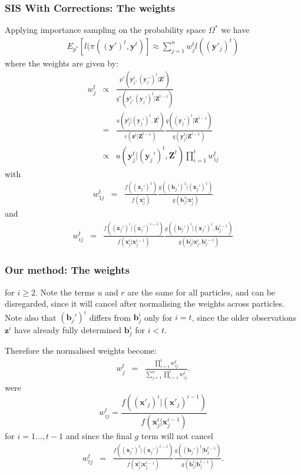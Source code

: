 \documentclass[9pt, xcolor={dvipsnames,svgnames,table}]{beamer}
\begin{document}
\begin{frame}
    \frametitle{SIS With Corrections: The weights}
    Applying importance sampling on the probability space $\Omega^*$ we have
    \begin{align*}
        E_{p^*}[l(\pi (\bm{(y')}^{t}, \bm{y}^{t})] 
        \approx \sum_{j=1}^n  w^{t}_j l((\bm{y}'_j)^{t})
    \end{align*}
    where the weights are given by:
    \begin{eqnarray*}
        w^{t}_j &\propto& \frac{p^*(\bm{y}_j^{t}, (\bm{y}_j')^{t} | \bm{Z}^{t})} {q^*(\bm{y}_j^{t}, (\bm{y}_j')^{t} |\bm{Z}^{t-1})} \\
        &=& \frac{u(\bm{y}_j^{t} | (\bm{y}_j')^{t}, \bm{Z}^{t})}{r(\bm{z}^{t} | \bm{Z}^{t-1})} \frac{q((\bm{y}_j')^{t} | \bm{Z}^{t-1})}{q(\bm{y}_j^{t} | \bm{Z}^{t-1})} \\
        & \propto & u(\bm{y}_j^{t} | (\bm{y}_j')^{t}, \bm{Z}^{t}) \prod_{i=1}^{t} w^{t}_{ij}
    \end{eqnarray*}
    with
    \begin{eqnarray*}
        w^{t}_{1j} &=& \frac{f((\bm{x}_j')^1)}{f(\bm{x}_j^1)} \frac{g((\bm{b}_j')^1 | (\bm{x}_j')^1)}{g(\bm{b}_j^1 | \bm{x}_j^1)}
    \end{eqnarray*}
    and
    \begin{eqnarray*}
        w^{t}_{ij} &=& \frac{f((\bm{x}_j')^i | (\bm{x}_j')^{i-1})}{f(\bm{x}_j^i | \bm{x}_j^{i-1})} \frac{g((\bm{b}_j')^i | (\bm{x}_j')^i, \bm{b}_j^{i-1})}{g(\bm{b}_j^i | \bm{x}_j^i, \bm{b}_j^{i-1})}
    \end{eqnarray*}
\end{frame}


\begin{frame}
    \frametitle{Our method: The weights}
    for $i \geq 2$.
    Note the terms $u$ and $r$ are the same for all particles, and can be disregarded, since it will cancel after normalising the weights across particles. Note also that $(\bm{b}_j')^i$ differs from $\bm{b}_j^i$ only for $i = t$, since the older observations $\bm{z}^{i}$ have already fully determined $\bm{b}_j^i$ for $i < t$. 

    Therefore the normalised weights become:
    \begin{eqnarray*}
        w^{t}_j &=& \frac{\prod_{i=1}^t w^{t}_{ij}}{\sum_{j=1}^n \prod_{i=1}^t w^{t}_{ij}}.
    \end{eqnarray*}
    were
    \begin{equation*}
        w^{t}_{ij} = \frac{f((\bm{x}'_j)^i | (\bm{x}'_j)^{i-1})}{f(\bm{x}^i_j | \bm{x}^{i-1}_j)} 
    \end{equation*}
    for $i = 1 \dots, t-1$ and since the final $g$ term will not cancel
        \begin{eqnarray*}
            w^{t}_{tj} &=& \frac{f((\bm{x}_j')^t | (\bm{x}_j')^{t-1})}{f(\bm{x}_j^t | \bm{x}_j^{t-1})} \frac{g((\bm{b}_j')^t | \bm{b}_j^{t-1})}{g(\bm{b}_j^t | \bm{b}_j^{t-1})}.
        \end{eqnarray*}


\end{frame}
\end{document}

